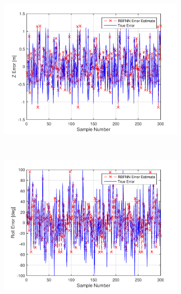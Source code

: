 \begin{figure}
\begin{subfigure}{0.3\textwidth}
    \caption{}
  \end{subfigure}
~
  \begin{subfigure}{0.3\textwidth}
    \includegraphics[width=\textwidth]{figures/chapter4/z_train}
    \caption{}
  \end{subfigure}
~
  \begin{subfigure}{0.3\textwidth}
    \includegraphics[width=\textwidth]{figures/chapter4/roll_train}
    \caption{}
  \end{subfigure}
~
  \begin{subfigure}{0.3\textwidth}

\end{subfigure}
\end{figure}
